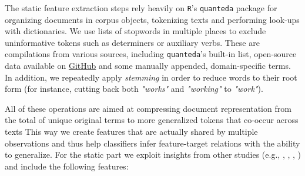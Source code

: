 The static feature extraction steps rely heavily on \texttt{R}'s 
\texttt{quanteda} package \citep{pkgquanteda} for organizing documents in corpus 
objects, tokenizing texts and performing look-ups with dictionaries.
We use lists of stopwords in multiple places to exclude uninformative 
tokens such as determiners or auxiliary verbs.
These are compilations from various sources, including \texttt{quanteda}'s 
built-in list, open-source data available on 
\href{https://github.com/stopwords-iso/stopwords-de}{GitHub} and some manually 
appended, domain-specific terms. 
In addition, we repeatedly apply \textit{stemming} in order to reduce words to 
their root form (for instance, cutting back both \textit{"works"} and 
\textit{"working"} to \textit{"work"}).

All of these operations are aimed at compressing document representation from 
the total of unique original terms to more generalized tokens that co-occur 
across texts
This way we create features that are actually shared by multiple observations 
and thus help classifiers infer feature-target relations with the ability to 
generalize.
For the static part we exploit insights from other studies 
(e.g., \citet{balyetal2017}, \citet{correaetal2017}, \citet{jabreelmoreno2017}, 
\citet{sidarenka2019})
and include the following features: 

